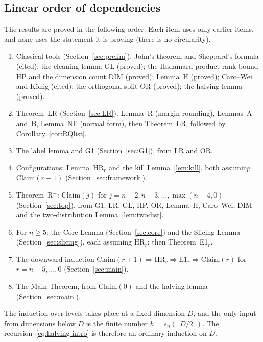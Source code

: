 \subsection{Linear order of dependencies}
The results are proved in the following order. Each item uses only earlier items, and none uses the
statement it is proving (there is no circularity).
\begin{enumerate}[label=\arabic*.,leftmargin=2em]
\item Classical tools (Section~\ref{sec:prelim}). John's theorem and Sheppard's formula (cited); the cleaning
  lemma GL (proved); the Hadamard-product rank bound HP and the dimension count DIM (proved); Lemma~H (proved);
  Caro--Wei and K\"onig (cited); the orthogonal split OR (proved); the halving lemma (proved).
\item Theorem~LR (Section~\ref{sec:LR}). Lemma~R (margin rounding), Lemmas~A and~B, Lemma~NF (normal form), then
  Theorem~LR, followed by Corollary~\ref{cor:RQlist}.
\item The label lemma and G1 (Section~\ref{sec:G1}), from LR and OR.
\item Configurations; Lemma~HR$_r$ and the kill Lemma~\ref{lem:kill}, both assuming Claim$(r+1)$
  (Section~\ref{sec:framework}).
\item Theorem~R$^+$: Claim$(j)$ for $j=n-2,n-3,\dots,\max(n-4,0)$ (Section~\ref{sec:top}), from G1, LR, GL, HP,
  OR, Lemma~H, Caro--Wei, DIM and the two-distribution Lemma~\ref{lem:twodist}.
\item For $n\ge 5$: the Core Lemma (Section~\ref{sec:core}) and the Slicing Lemma (Section~\ref{sec:slicing}),
  each assuming HR$_r$; then Theorem~E1$_r$.
\item The downward induction $\text{Claim}(r+1)\Rightarrow\text{HR}_r\Rightarrow\text{E1}_r\Rightarrow
  \text{Claim}(r)$ for $r=n-5,\dots,0$ (Section~\ref{sec:main}).
\item The Main Theorem, from Claim$(0)$ and the halving lemma (Section~\ref{sec:main}).
\end{enumerate}
The induction over levels takes place at a fixed dimension $D$, and the only input from dimensions below $D$ is
the finite number $h=s_n(\lfloor D/2\rfloor)$. The recursion~\eqref{eq:halving-intro} is therefore an ordinary
induction on $D$.

